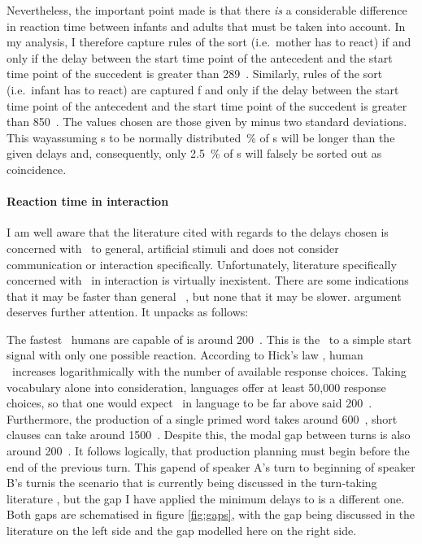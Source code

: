 Nevertheless, the important point made is that there \emph{is} a considerable difference in reaction time between infants and adults that must be taken into account.
In my analysis, I therefore capture rules of the sort  (i.e.~mother has to react) if and only if the delay between the start time point of the antecedent and the start time point of the succedent is greater than 289~\ms.
Similarly, rules of the sort  (i.e.~infant has to react) are captured f and only if the delay between the start time point of the antecedent and the start time point of the succedent is greater than 850~\ms.
The values chosen are those given by \citet{leibold_relationship_2002} minus two standard deviations.
This way\dash assuming \rt s to be normally distributed~\% of \rt s will be longer than the given delays \citep[]{moore_introduction_2017} and, consequently, only 2.5~\% of \rt s will falsely be sorted out as coincidence.

\paragraph{Reaction time in interaction}
I am well aware that the literature cited with regards to the delays chosen is concerned with \rt\ to general, artificial stimuli and does not consider communication or interaction specifically.
Unfortunately, literature specifically concerned with \rt\ in interaction is virtually inexistent.
There are some indications that it may be faster than general \rt\ \citep{levinson_turn-taking_2016}, but none that it may be slower.
 argument deserves further attention.
It unpacks as follows:

The fastest \rt\ humans are capable of is around 200~\ms.
This is the \rt\ to a simple start signal with only one possible reaction.
According to Hick's law \citep{hick_rate_1952}, human \rt\ increases logarithmically with the number of available response choices.
Taking vocabulary alone into consideration, languages offer at least 50,000 response choices, so that one would expect \rt\ in language to be far above said 200~\ms.
Furthermore, the production of a single primed word takes around 600~\ms, short clauses can take around 1500~\ms.
Despite this, the modal gap between turns is also around 200~\ms.
It follows logically, that production planning must begin before the end of the previous turn.
This gap\dash end of speaker A's turn to beginning of speaker B's turn\dash is the scenario that is currently being discussed in the turn-taking literature \citep[e.g.][among many others]{bogels_listeners_2015,bogels_planning_2018,garrod_use_2015,levinson_timing_2015,riest_anticipation_2015}, but the gap I have applied the minimum delays to is a different one.
Both gaps are schematised in figure \ref{fig:gaps}, with the gap being discussed in the literature on the left side and the gap modelled here on the right side.

